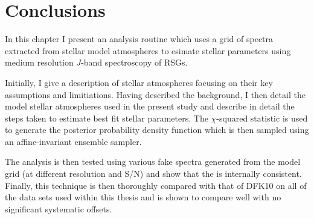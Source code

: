 


\section{Conclusions} %
\label{sub:conclusions}

In this chapter I present an analysis routine which uses a grid of spectra extracted from stellar model atmospheres to esimate stellar parameters using medium resolution $J$-band spectroscopy of RSGs.

Initially, I give a description of stellar atmospheres focusing on their key assumptions and limitiations.
Having described the background, I then detail the model stellar atmospheres used in the present study and describe in detail the steps taken to estimate best fit stellar parameters.
The $\chi$-squared statistic is used to generate the posterior probability density function which is then sampled using an affine-invariant ensemble sampler.

The analysis is then tested using various fake spectra generated from the model grid (at different resolution and S/N) and show that the is internally consistent.
Finally, this technique is then thoroughly compared with that of DFK10 on all of the data sets used within this thesis and is shown to compare well with no significant systematic offsets.

